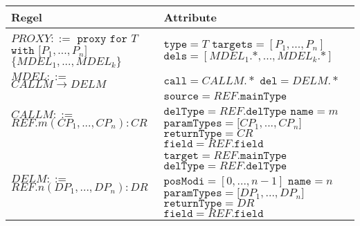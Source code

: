 \documentclass[a4paper,12pt]{article}
\begin{document}
\begin{table}[H]
\centering
\begin{tabular}{|p{6cm}|p{8cm}|}
\hline
\hline
\centering\textbf{Regel} & \textbf{Attribute} \\
\hline
\hline
$\mathit{PROXY} ::=$\newline
$\texttt{proxy } \texttt{for } T$\newline
$ \texttt{with [}\mathit{P_1},...,\mathit{P_n}\texttt{]}$ \newline
$\texttt{\{}\mathit{MDEL_1},...,\mathit{MDEL_k} \texttt{\}}$
& 
$\texttt{type} = \mathit{T}$\newline
$\texttt{targets} = [\mathit{P_1},...,\mathit{P_n}]$\newline
$\texttt{dels} = [\mathit{MDEL_1}\texttt{.}\text{*},...,\mathit{MDEL_k}\texttt{.}\text{*}]$
\\
\hline
$\mathit{MDEL} ::=$\newline
$\mathit{CALLM} \rightarrow \mathit{DELM} $  
& 
$\texttt{call} = \mathit{CALLM}.*$\newline
$\texttt{del} = \mathit{DELM}.*$
\\
\hline
$\mathit{CALLM} ::=$\newline 
$\mathit{REF}.\mathit{m(\mathit{CP_1},...,\mathit{CP_n}):CR}$
& 
$\texttt{source} = \mathit{REF.\texttt{mainType}}$\newline
$\texttt{delType} = \mathit{REF.\texttt{delType}}$\newline
$\texttt{name} = \mathit{m}$\newline
$\texttt{paramTypes} = \mathit{[CP_1},...,\mathit{CP_n]}$\newline
$\texttt{returnType} = \mathit{CR}$\newline
$\texttt{field} = \mathit{REF}\texttt{.field}$
\\
\hline
$\mathit{DELM} ::=$\newline 
$\mathit{REF}\texttt{.}n(\mathit{DP_1},...,\mathit{DP_n}):DR $  
&
$\texttt{target} = \mathit{REF}.\texttt{mainType}$\newline
$\texttt{delType} = \mathit{REF}.\texttt{delType}$\newline
$\texttt{posModi} = [0,...,\mathit{n}-1]$\newline
$\texttt{name} = \mathit{n}$\newline
$\texttt{paramTypes} = \mathit{[DP_1},...,\mathit{DP_n]}$\newline
$\texttt{returnType} = \mathit{DR}$\newline
$\texttt{field} = \mathit{REF}\texttt{.field}$

\end{tabular}
\end{table}
\end{document}
